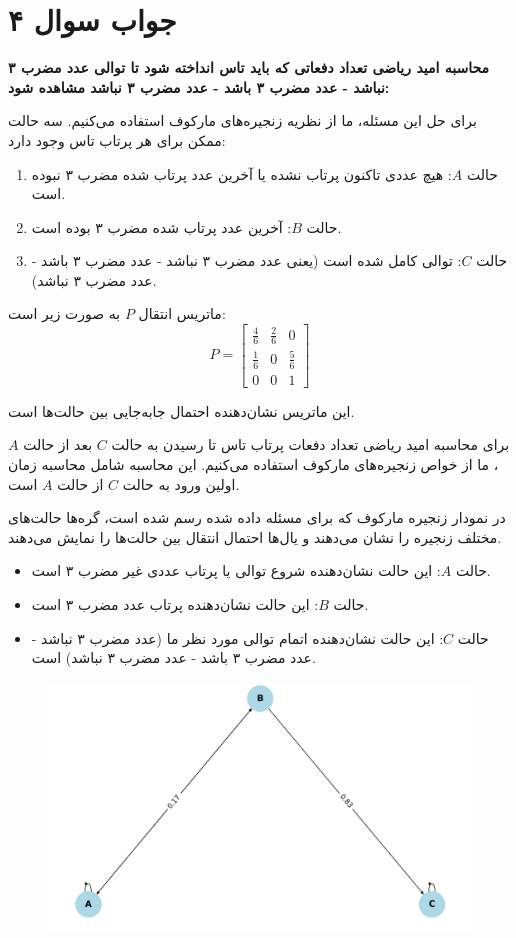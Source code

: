 \section*{جواب سوال ۴}

\textbf{محاسبه امید ریاضی تعداد دفعاتی که باید تاس انداخته شود تا توالی عدد مضرب ۳ نباشد - عدد مضرب ۳ باشد - عدد مضرب ۳ نباشد مشاهده شود:}

برای حل این مسئله، ما از نظریه زنجیره‌های مارکوف استفاده می‌کنیم. سه حالت ممکن برای هر پرتاب تاس وجود دارد:

\begin{enumerate}
	\item حالت \(A\): هیچ عددی تاکنون پرتاب نشده یا آخرین عدد پرتاب شده مضرب ۳ نبوده است.
	\item حالت \(B\): آخرین عدد پرتاب شده مضرب ۳ بوده است.
	\item حالت \(C\): توالی کامل شده است (یعنی عدد مضرب ۳ نباشد - عدد مضرب ۳ باشد - عدد مضرب ۳ نباشد).
\end{enumerate}

ماتریس انتقال \(P\) به صورت زیر است:
\[ P = \begin{bmatrix}
	\frac{4}{6} & \frac{2}{6} & 0 \\
	\frac{1}{6} & 0 & \frac{5}{6} \\
	0 & 0 & 1
\end{bmatrix} \]

این ماتریس نشان‌دهنده احتمال جابه‌جایی بین حالت‌ها است.

برای محاسبه امید ریاضی تعداد دفعات پرتاب تاس تا رسیدن به حالت \(C\) بعد از حالت \(A\)، ما از خواص زنجیره‌های مارکوف استفاده می‌کنیم. این محاسبه شامل محاسبه زمان اولین ورود به حالت \(C\) از حالت \(A\) است.

در نمودار زنجیره مارکوف که برای مسئله داده شده رسم شده است، گره‌ها حالت‌های مختلف زنجیره را نشان می‌دهند و یال‌ها احتمال انتقال بین حالت‌ها را نمایش می‌دهند. 

\begin{itemize}
	\item حالت \(A\): این حالت نشان‌دهنده شروع توالی یا پرتاب عددی غیر مضرب ۳ است.
	\item حالت \(B\): این حالت نشان‌دهنده پرتاب عدد مضرب ۳ است.
	\item حالت \(C\): این حالت نشان‌دهنده اتمام توالی مورد نظر ما (عدد مضرب ۳ نباشد - عدد مضرب ۳ باشد - عدد مضرب ۳ نباشد) است.
\end{itemize}

\begin{figure}[H]
	\centering
	\includegraphics{pic2.jpg}
	\label{fig:label4}
\end{figure}
